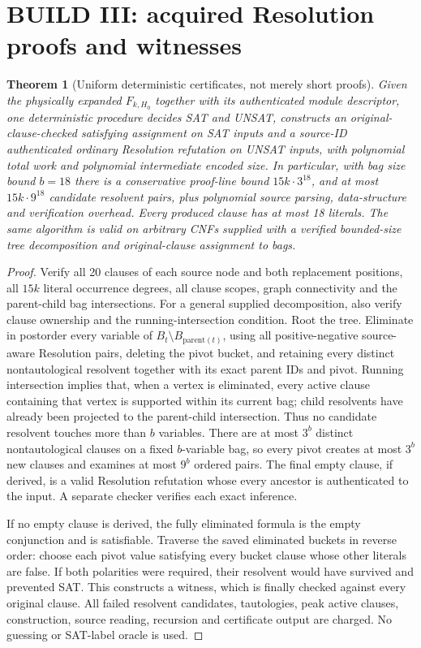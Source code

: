 \documentclass[11pt]{article}
\newtheorem{theorem}{Theorem}
\begin{document}
\section{BUILD III: acquired Resolution proofs and witnesses}
\begin{theorem}[Uniform deterministic certificates, not merely short proofs]\label{thm:certificate}
Given the physically expanded $F_{k,H_0}$ together with its authenticated module descriptor, one deterministic procedure decides SAT and UNSAT, constructs an original-clause-checked satisfying assignment on SAT inputs and a source-ID authenticated ordinary Resolution refutation on UNSAT inputs, with polynomial total work and polynomial intermediate encoded size. In particular, with bag size bound $b=18$ there is a conservative proof-line bound $15k\cdot3^{18}$, and at most $15k\cdot9^{18}$ candidate resolvent pairs, plus polynomial source parsing, data-structure and verification overhead. Every produced clause has at most 18 literals. The same algorithm is valid on arbitrary CNFs supplied with a verified bounded-size tree decomposition and original-clause assignment to bags.
\end{theorem}
\begin{proof}
Verify all 20 clauses of each source node and both replacement positions, all $15k$ literal occurrence degrees, all clause scopes, graph connectivity and the parent-child bag intersections. For a general supplied decomposition, also verify clause ownership and the running-intersection condition. Root the tree. Eliminate in postorder every variable of $B_t\setminus B_{\mathrm{parent}(t)}$, using all positive-negative source-aware Resolution pairs, deleting the pivot bucket, and retaining every distinct nontautological resolvent together with its exact parent IDs and pivot. Running intersection implies that, when a vertex is eliminated, every active clause containing that vertex is supported within its current bag; child resolvents have already been projected to the parent-child intersection. Thus no candidate resolvent touches more than $b$ variables. There are at most $3^b$ distinct nontautological clauses on a fixed $b$-variable bag, so every pivot creates at most $3^b$ new clauses and examines at most $9^b$ ordered pairs. The final empty clause, if derived, is a valid Resolution refutation whose every ancestor is authenticated to the input. A separate checker verifies each exact inference.

If no empty clause is derived, the fully eliminated formula is the empty conjunction and is satisfiable. Traverse the saved eliminated buckets in reverse order: choose each pivot value satisfying every bucket clause whose other literals are false. If both polarities were required, their resolvent would have survived and prevented SAT. This constructs a witness, which is finally checked against every original clause. All failed resolvent candidates, tautologies, peak active clauses, construction, source reading, recursion and certificate output are charged. No guessing or SAT-label oracle is used.
\end{proof}
\end{document}
